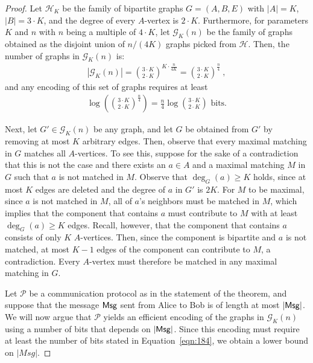 \documentclass[11pt,a4paper]{article}
\begin{document}
\begin{proof}
 Let $\mathcal{H}_K$ be the family of bipartite graphs $G=(A, B, E)$ with $|A| = K$, $|B| = 3 \cdot K$, and the degree of every $A$-vertex is $2 \cdot K$.
 Furthermore, for parameters $K$ and $n$ with $n$ being a multiple of $4 \cdot K$, let $\mathcal{G}_K(n)$ be the family of graphs obtained as the disjoint union of $n / (4K)$ graphs picked from $\mathcal{H}$.
 Then, the number of graphs in $\mathcal{G}_K(n)$ is:
 \begin{align*}
  |\mathcal{G}_K(n)| = {3 \cdot K \choose 2 \cdot K}^{K \cdot \frac{n}{4 K}} 
   = {3 \cdot K \choose 2 \cdot K}^{\frac{n}{4}}  \ , 
\end{align*}
and any encoding of this set of graphs requires at least
\begin{align}
 \log \left( {3 \cdot K \choose 2 \cdot K}^{\frac{n}{4}} \right) = \frac{n}{4} \log {3 \cdot K \choose 2 \cdot K} \text{ bits.} \label{eqn:184}
\end{align}



 Next, let $G' \in \mathcal{G}_K(n)$ be any graph, and let $G$ be obtained from $G'$ by removing at most $K$ arbitrary edges. Then, observe that every maximal matching in $G$ matches all $A$-vertices. To see this, suppose for the sake of a contradiction that this is not the case and there exists an $a \in A$ and a maximal matching $M$ in $G$ such that $a$ is not matched in $M$. Observe that $\deg_G(a) \ge K$ holds, since at most $K$ edges are deleted and the degree of $a$ in $G'$ is $2K$. For $M$ to be maximal, since $a$ is not matched in $M$, all of $a$'s neighbors must be matched in $M$, which implies that the component that contains $a$ must contribute to $M$ with at least $\deg_G(a) \ge K$ edges. Recall, however, that the component that contains $a$ consists of only $K$ $A$-vertices. Then, since the component is bipartite and $a$ is not matched, at most $K-1$ edges of the component can contribute to $M$, a contradiction. Every $A$-vertex must therefore be matched in any maximal matching in $G$.
  
 Let $\mathcal{P}$ be a communication protocol as in the statement of the theorem, and suppose that the message ${\sf Msg}$ sent from Alice to Bob is of length at most $|{\sf Msg}|$. 
We will now argue that $\mathcal{P}$ yields an efficient encoding of the graphs in $\mathcal{G}_K(n)$ using a number of bits that depends on $|{\sf Msg}|$. Since this encoding must require at least the number of bits stated in Equation~\ref{eqn:184}, we obtain a lower bound on $|Msg|$.



\end{proof}
\end{document}
